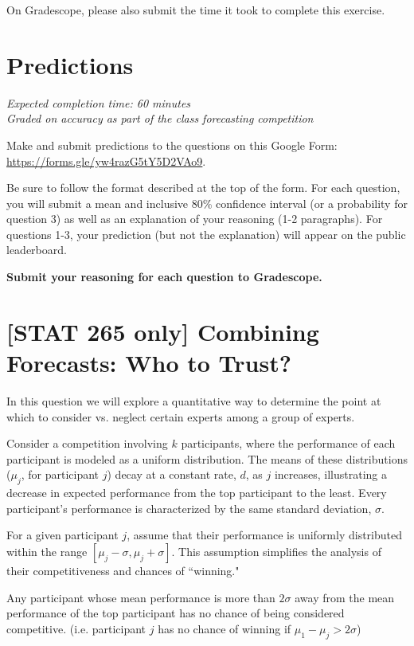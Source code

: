 \documentclass[11pt]{article}
\begin{document}
On Gradescope, please also submit the time it took to complete this exercise.

\section*{Predictions} 

\emph{Expected completion time: 60 minutes} \\
\emph{Graded on accuracy as part of the class forecasting competition}

Make and submit predictions to the questions on this Google Form: \\ \url{https://forms.gle/yw4razG5tY5D2VAo9}.

Be sure to follow the format
described at the top of the form.
For each question, you will submit a mean and inclusive 80\% confidence interval (or a probability
for question 3) as well as an explanation of your reasoning (1-2 paragraphs).
For questions 1-3, your prediction (but not the explanation) will appear on the public leaderboard.

\textbf{Submit your reasoning for each question to Gradescope.}


\newpage
\section*{[STAT 265 only] Combining Forecasts: Who to Trust?}
In this question we will explore a quantitative way to determine the point at which to consider vs. neglect certain experts among a group of experts.

Consider a competition involving \(k\) participants, where the performance of each participant is modeled as a uniform distribution. The means of these distributions (\(\mu_j\), for participant \(j\)) decay at a constant rate, $d$, as \(j\) increases, illustrating a decrease in expected performance from the top participant to the least. Every participant's performance is characterized by the same standard deviation, \(\sigma\).

For a given participant \(j\), assume that their performance is uniformly distributed within the range \([\mu_j - \sigma, \mu_j + \sigma]\). This assumption simplifies the analysis of their competitiveness and chances of ``winning."

Any participant whose mean performance is more than \(2\sigma\) away from the mean performance of the top participant has no chance of being considered competitive. (i.e. participant $j$ has no chance of winning if \(\mu_1 - \mu_j > 2\sigma\))
\end{document}
